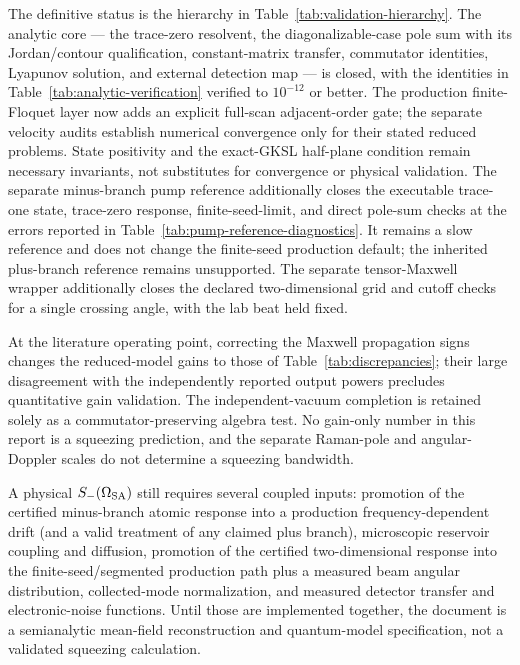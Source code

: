 \documentclass[11pt,a4paper]{article}
\begin{document}
The definitive status is the hierarchy in Table~\ref{tab:validation-hierarchy}.
The analytic core --- the trace-zero resolvent, the diagonalizable-case pole
sum with its Jordan/contour qualification, constant-matrix transfer,
commutator identities, Lyapunov solution, and external detection map --- is
closed, with the identities in Table~\ref{tab:analytic-verification}
verified to $10^{-12}$ or better. The production finite-Floquet layer now adds an
explicit full-scan adjacent-order gate; the separate velocity audits establish
numerical convergence only for their stated reduced problems. State positivity
and the exact-GKSL half-plane condition remain necessary invariants, not
substitutes for convergence or physical validation.
The separate minus-branch pump reference additionally closes the executable
trace-one state, trace-zero response, finite-seed-limit, and direct pole-sum
checks at the errors reported in Table~\ref{tab:pump-reference-diagnostics}.
It remains a slow reference and does not change the finite-seed production
default; the inherited plus-branch reference remains unsupported.
The separate tensor-Maxwell wrapper additionally closes the declared
two-dimensional grid and cutoff checks for a single crossing angle, with the
lab beat held fixed.

At the literature operating point, correcting the Maxwell propagation signs
changes the reduced-model gains to those of Table~\ref{tab:discrepancies}; their
large disagreement with the independently reported output powers precludes
quantitative gain validation. The independent-vacuum completion is retained
solely as a commutator-preserving algebra test. No gain-only number in this report is
a squeezing prediction, and the separate Raman-pole and angular-Doppler scales
do not determine a squeezing bandwidth.

A physical $S_-(\Omega_{\rm SA})$ still requires several coupled inputs:
promotion of the certified minus-branch atomic response into a production
frequency-dependent drift (and a valid treatment of any claimed plus branch),
microscopic reservoir coupling and diffusion, promotion of the certified
two-dimensional response into the finite-seed/segmented production path plus a
measured beam angular distribution, collected-mode normalization, and measured
detector transfer and electronic-noise functions.
Until those are implemented together, the document is a semianalytic
mean-field reconstruction and quantum-model specification, not a validated
squeezing calculation.

\appendix
\end{document}
